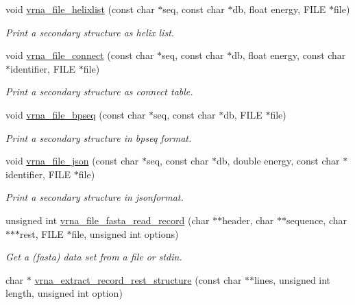 \begin{DoxyCompactItemize}
void \mbox{\hyperlink{group__file__utils_gaaface7db12fadc3d271641c4515ab6e4}{vrna\+\_\+file\+\_\+helixlist}} (const char $\ast$seq, const char $\ast$db, float energy, F\+I\+LE $\ast$file)
\begin{DoxyCompactList}\small\item\em Print a secondary structure as helix list. \end{DoxyCompactList}\item 
void \mbox{\hyperlink{group__file__utils_gab69682373ccca1e0e28cc967eec07745}{vrna\+\_\+file\+\_\+connect}} (const char $\ast$seq, const char $\ast$db, float energy, const char $\ast$identifier, F\+I\+LE $\ast$file)
\begin{DoxyCompactList}\small\item\em Print a secondary structure as connect table. \end{DoxyCompactList}\item 
void \mbox{\hyperlink{group__file__utils_ga9b462e6f202594af5d3fa56e280d633f}{vrna\+\_\+file\+\_\+bpseq}} (const char $\ast$seq, const char $\ast$db, F\+I\+LE $\ast$file)
\begin{DoxyCompactList}\small\item\em Print a secondary structure in bpseq format. \end{DoxyCompactList}\item 
void \mbox{\hyperlink{group__file__utils_ga31f4a6c2ea1495a6e4f9eb45a9f6193d}{vrna\+\_\+file\+\_\+json}} (const char $\ast$seq, const char $\ast$db, double energy, const char $\ast$identifier, F\+I\+LE $\ast$file)
\begin{DoxyCompactList}\small\item\em Print a secondary structure in jsonformat. \end{DoxyCompactList}\item 
unsigned int \mbox{\hyperlink{group__file__utils_ga8cfb7e271efc9e1f34640acb85475639}{vrna\+\_\+file\+\_\+fasta\+\_\+read\+\_\+record}} (char $\ast$$\ast$header, char $\ast$$\ast$sequence, char $\ast$$\ast$$\ast$rest, F\+I\+LE $\ast$file, unsigned int options)
\begin{DoxyCompactList}\small\item\em Get a (fasta) data set from a file or stdin. \end{DoxyCompactList}\item 
char $\ast$ \mbox{\hyperlink{group__file__utils_gad37cbb63a05eed63ba25c91628409be0}{vrna\+\_\+extract\+\_\+record\+\_\+rest\+\_\+structure}} (const char $\ast$$\ast$lines, unsigned int length, unsigned int option)
$$
\end{DoxyCompactItemize}
